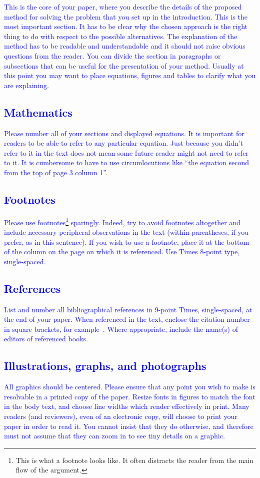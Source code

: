 \documentclass[10pt,twocolumn,letterpaper]{article}
\begin{document}
\textcolor{blue}{
This is the core of your paper, where you describe the details of the proposed method for solving the problem that you set up in the introduction. This is the most important section. It has to be clear why the chosen approach is the right thing to do with respect to the possible alternatives. The explanation of the method has to be readable and understandable and it should not raise obvious questions from the reader. 
You can divide the section in paragraphs or subsections that can be useful for the presentation of your method. Usually at this point you may want to place equations, figures and tables to clarify what you are explaining.
\subsection{Mathematics}
Please number all of your sections and displayed equations.  It is
important for readers to be able to refer to any particular equation.  Just
because you didn't refer to it in the text does not mean some future reader
might not need to refer to it.  It is cumbersome to have to use
circumlocutions like ``the equation second from the top of page 3 column
1''. 
\subsection{Footnotes}
Please use footnotes\footnote {This is what a footnote looks like.  It
often distracts the reader from the main flow of the argument.} sparingly.
Indeed, try to avoid footnotes altogether and include necessary peripheral
observations in
the text (within parentheses, if you prefer, as in this sentence).  If you
wish to use a footnote, place it at the bottom of the column on the page on
which it is referenced. Use Times 8-point type, single-spaced.
\subsection{References}
List and number all bibliographical references in 9-point Times,
single-spaced, at the end of your paper. When referenced in the text,
enclose the citation number in square brackets, for
example~\cite{Authors14}.  Where appropriate, include the name(s) of
editors of referenced books.
\subsection{Illustrations, graphs, and photographs}
All graphics should be centered.  Please ensure that any point you wish to
make is resolvable in a printed copy of the paper.  Resize fonts in figures
to match the font in the body text, and choose line widths which render
effectively in print.  Many readers (and reviewers), even of an electronic
copy, will choose to print your paper in order to read it.  You cannot
insist that they do otherwise, and therefore must not assume that they can
zoom in to see tiny details on a graphic.}
\end{document}
